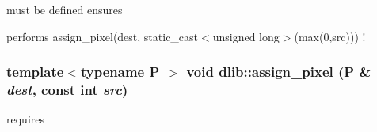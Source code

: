 must be defined ensures
\begin{DoxyItemize}
\item performs assign\_\-pixel(dest, static\_\-cast$<$unsigned long$>$(max(0,src))) ! 
\end{DoxyItemize}\hypertarget{namespacedlib_a88c00fa9d7ea718f6198c72451378f2a}{
\subsubsection[{assign\_\-pixel}]{\setlength{\rightskip}{0pt plus 5cm}template$<$typename P $>$ void dlib::assign\_\-pixel (P \& {\em dest}, \/  const int {\em src})}}
\label{namespacedlib_a88c00fa9d7ea718f6198c72451378f2a}
requires
